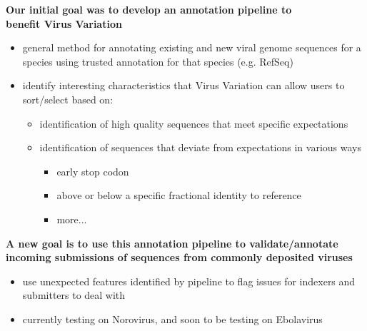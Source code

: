 \documentclass[landscape]{slides}
\begin{document}
\begin{slide}
\begin{center}
\textbf{Our initial goal was to develop an annotation pipeline to \\ benefit Virus Variation}

\small
\begin{itemize}
\item general method for annotating existing and new viral genome
  sequences for a species using trusted annotation for that species (e.g. RefSeq)
\item identify interesting characteristics that Virus Variation can
  allow users to sort/select based on:
\begin{itemize}
  \item identification of high quality sequences that meet specific expectations
  \item identification of sequences that deviate from expectations in
    various ways
    \begin{itemize}
      \item early stop codon
      \item above or below a specific fractional identity to reference 
      \item more...
    \end{itemize}
\end{itemize}
\end{itemize}

\normalsize
\textbf{A new goal is to use this annotation pipeline to validate/annotate incoming submissions of sequences from commonly deposited viruses} 

\small
\begin{itemize}
\item use unexpected features identified by pipeline to flag issues for indexers and submitters to deal with
\item currently testing on Norovirus, and soon to be testing on Ebolavirus
\end{itemize}

\end{center}
\vfill
\end{slide}
\end{document}

